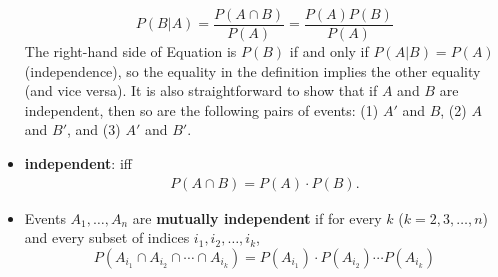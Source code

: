 \documentclass{report}
\begin{document}
\begin{itemize}
            \[
                P(B|A) = \frac{P(A \cap B)}{P(A)} = \frac{P(A)P(B)}{P(A)}
            \]
            The right-hand side of Equation is \( P(B) \) if and only if \( P(A|B) = P(A) \) (independence), so the equality in the definition implies the other equality (and vice versa). It is also straightforward to show that if \( A \) and \( B \) are independent, then so are the following pairs of events: (1) \( A' \) and \( B \), (2) \( A \) and \( B' \), and (3) \( A' \) and \( B' \).
        \item \textbf{independent}: iff
            \begin{align*}
                P(A \cap B) = P(A) \cdot P(B)
            .\end{align*}
        \item 
            Events \( A_1, \ldots, A_n \) are \textbf{mutually independent} if for every \( k \) (\( k = 2, 3, \ldots, n \)) and every subset of indices \( i_1, i_2, \ldots, i_k \),
            \[
                P(A_{i_1} \cap A_{i_2} \cap \cdots \cap A_{i_k}) = P(A_{i_1}) \cdot P(A_{i_2}) \cdots P(A_{i_k})
            \]
    \end{itemize}

    \pagebreak \bigbreak \noindent   
\end{document}
